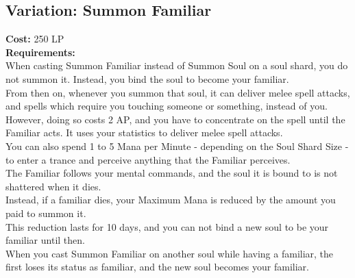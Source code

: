 \subsection{Variation: Summon Familiar}\label{spell:summonFamiliar}
\textbf{Cost:} 250 LP\\
\textbf{Requirements:} ~\\
When casting Summon Familiar instead of Summon Soul on a soul shard, you do not summon it.
Instead, you bind the soul to become your familiar.\\
From then on, whenever you summon that soul, it can deliver melee spell attacks, and spells which require you touching someone or something, instead of you.
However, doing so costs 2 AP, and you have to concentrate on the spell until the Familiar acts.
It uses your statistics to deliver melee spell attacks.\\
You can also spend 1 to 5 Mana per Minute - depending on the Soul Shard Size - to enter a trance and perceive anything that the Familiar perceives.\\
The Familiar follows your mental commands, and the soul it is bound to is not shattered when it dies.\\
Instead, if a familiar dies, your Maximum Mana is reduced by the amount you paid to summon it.\\
This reduction lasts for 10 days, and you can not bind a new soul to be your familiar until then.\\
When you cast Summon Familiar on another soul while having a familiar, the first loses its status as familiar, and the new soul becomes your familiar.\\
